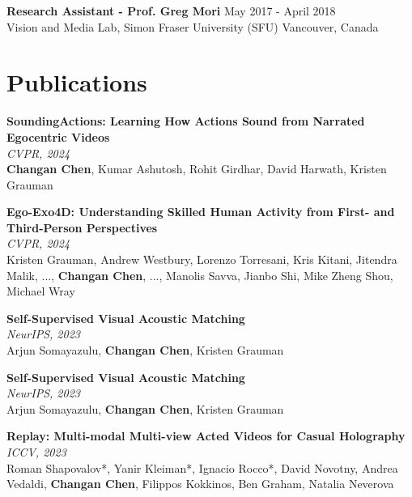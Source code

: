 \documentclass[margin, 10pt]{res} %
\begin{document}
\begin{resume}
\textbf{Research Assistant - Prof. Greg Mori} \hfill May 2017 - April 2018 \\ 
Vision and Media Lab, Simon Fraser University (SFU) \hfill Vancouver, Canada



\section{Publications}

\textbf{SoundingActions: Learning How Actions Sound from Narrated Egocentric Videos} \\
\textit{CVPR, 2024} \\
\textbf{Changan Chen}, Kumar Ashutosh, Rohit Girdhar, David Harwath, Kristen Grauman

\textbf{Ego-Exo4D: Understanding Skilled Human Activity from First- and Third-Person Perspectives} \\
\textit{CVPR, 2024} \\
Kristen Grauman, Andrew Westbury, Lorenzo Torresani, Kris Kitani, Jitendra Malik, ..., \textbf{Changan Chen}, ..., Manolis Savva, Jianbo Shi, Mike Zheng Shou, Michael Wray

\textbf{Self-Supervised Visual Acoustic Matching} \\
\textit{NeurIPS, 2023} \\
Arjun Somayazulu, \textbf{Changan Chen}, Kristen Grauman

\textbf{Self-Supervised Visual Acoustic Matching} \\
\textit{NeurIPS, 2023} \\
Arjun Somayazulu, \textbf{Changan Chen}, Kristen Grauman

\textbf{Replay: Multi-modal Multi-view Acted Videos for Casual Holography} \\
\textit{ICCV, 2023} \\
Roman Shapovalov*, Yanir Kleiman*, Ignacio Rocco*, David Novotny, Andrea Vedaldi, \textbf{Changan Chen}, Filippos Kokkinos, Ben Graham, Natalia Neverova


\end{resume}
\end{document}
